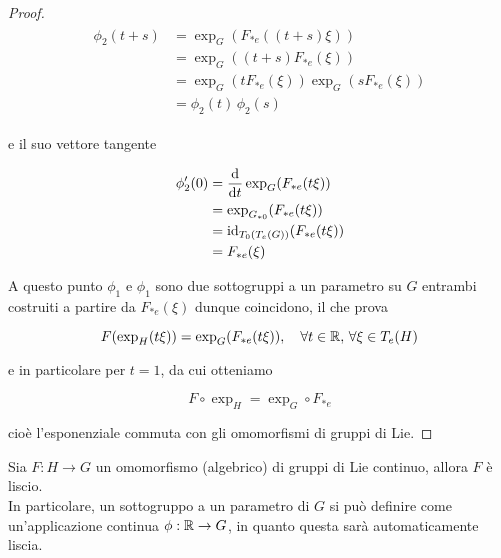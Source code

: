\begin{proof}
	\begin{align}
		\begin{split}
			\phi_{2}(t+s) &= \exp_{G}(F_{*e}((t+s) \xi))\\
			&= \exp_{G}((t+s) F_{*e}(\xi))\\
			&= \exp_{G}(t F_{*e}(\xi)) \exp_{G}(s F_{*e}(\xi))\\
			&= \phi_{2}(t) \, \phi_{2}(s)
		\end{split}
	\end{align}

	e il suo vettore tangente
	
	\begin{align}
		\begin{split}
			\phi'_{2}(0) &= \dv{t} \exp_{G}(F_{*e}(t \xi))\\
			&= \exp_{G_{*0}} (F_{*e}(t \xi))\\
			&= \operatorname{id}_{T_{0}(T_{e}(G))} (F_{*e}(t \xi))\\
			&= F_{*e}(\xi)
		\end{split}
	\end{align}

	A questo punto $ \phi_{1} $ e $ \phi_{1} $ sono due sottogruppi a un parametro su $ G $ entrambi costruiti a partire da $ F_{*e}(\xi) $ dunque coincidono, il che prova
	
	\begin{equation}
		F(\exp_{H}(t \xi)) = \exp_{G}(F_{*e}(t \xi)) \qcomma \forall t \in \R, \, \forall \xi \in T_{e}(H)
	\end{equation}

	e in particolare per $ t=1 $, da cui otteniamo
	
	\begin{equation}
		F \circ \exp_{H} = \exp_{G} \circ F_{*e}
	\end{equation}

	cioè l'esponenziale commuta con gli omomorfismi di gruppi di Lie.
\end{proof}

\begin{corollary}\label{om-cont-smooth}
	Sia $ F : H \to G $ un omomorfismo (algebrico) di gruppi di Lie continuo, allora $ F $ è liscio.\\
	In particolare, un sottogruppo a un parametro di $ G $ si può definire come un'applicazione continua $ \phi : \mathbb{R} \to G $, in quanto questa sarà automaticamente liscia.
\end{corollary}


